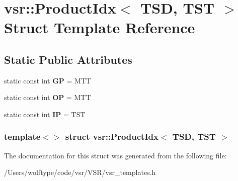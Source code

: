 \hypertarget{structvsr_1_1_product_idx_3_01_t_s_d_00_01_t_s_t_01_4}{\section{vsr\-:\-:Product\-Idx$<$ T\-S\-D, T\-S\-T $>$ Struct Template Reference}
\label{structvsr_1_1_product_idx_3_01_t_s_d_00_01_t_s_t_01_4}
}
\subsection*{Static Public Attributes}
\begin{DoxyCompactItemize}
\item 
\hypertarget{structvsr_1_1_product_idx_3_01_t_s_d_00_01_t_s_t_01_4_a0925ba9dcd295f30b3401daf3a5a1002}{static const int {\bfseries G\-P} = M\-T\-T}\label{structvsr_1_1_product_idx_3_01_t_s_d_00_01_t_s_t_01_4_a0925ba9dcd295f30b3401daf3a5a1002}

\item 
\hypertarget{structvsr_1_1_product_idx_3_01_t_s_d_00_01_t_s_t_01_4_a534d7735ac99ae351146d9d7a21de592}{static const int {\bfseries O\-P} = M\-T\-T}\label{structvsr_1_1_product_idx_3_01_t_s_d_00_01_t_s_t_01_4_a534d7735ac99ae351146d9d7a21de592}

\item 
\hypertarget{structvsr_1_1_product_idx_3_01_t_s_d_00_01_t_s_t_01_4_a0a713cee7abade4d4abe15a2af90e4bb}{static const int {\bfseries I\-P} = T\-S\-T}\label{structvsr_1_1_product_idx_3_01_t_s_d_00_01_t_s_t_01_4_a0a713cee7abade4d4abe15a2af90e4bb}

\end{DoxyCompactItemize}
\subsubsection*{template$<$$>$ struct vsr\-::\-Product\-Idx$<$ T\-S\-D, T\-S\-T $>$}



The documentation for this struct was generated from the following file\-:\begin{DoxyCompactItemize}
\item 
/\-Users/wolftype/code/vsr/\-V\-S\-R/vsr\-\_\-templates.\-h\end{DoxyCompactItemize}
